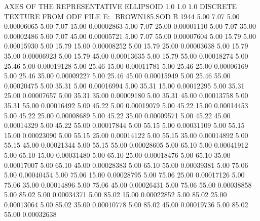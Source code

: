 AXES OF THE REPRESENTATIVE ELLIPSOID
   1.0   1.0   1.0
DISCRETE TEXTURE FROM ODF FILE  E:\TEXTURES\ZR_BROWN\7185.SOD      
B    1944
      5.00      7.07      5.00     0.00006065
      5.00      7.07     15.00     0.00002863
      5.00      7.07     25.00     0.00001110
      5.00      7.07     35.00     0.00002486
      5.00      7.07     45.00     0.00005721
      5.00      7.07     55.00     0.00007604
      5.00     15.79      5.00     0.00015930
      5.00     15.79     15.00     0.00008252
      5.00     15.79     25.00     0.00003638
      5.00     15.79     35.00     0.00006923
      5.00     15.79     45.00     0.00013635
      5.00     15.79     55.00     0.00018274
      5.00     25.46      5.00     0.00019128
      5.00     25.46     15.00     0.00011781
      5.00     25.46     25.00     0.00006169
      5.00     25.46     35.00     0.00009227
      5.00     25.46     45.00     0.00015949
      5.00     25.46     55.00     0.00020475
      5.00     35.31      5.00     0.00016994
      5.00     35.31     15.00     0.00012295
      5.00     35.31     25.00     0.00007657
      5.00     35.31     35.00     0.00009180
      5.00     35.31     45.00     0.00013758
      5.00     35.31     55.00     0.00016492
      5.00     45.22      5.00     0.00019079
      5.00     45.22     15.00     0.00014453
      5.00     45.22     25.00     0.00008689
      5.00     45.22     35.00     0.00009571
      5.00     45.22     45.00     0.00014329
      5.00     45.22     55.00     0.00017844
      5.00     55.15      5.00     0.00031109
      5.00     55.15     15.00     0.00023090
      5.00     55.15     25.00     0.00014122
      5.00     55.15     35.00     0.00014892
      5.00     55.15     45.00     0.00021344
      5.00     55.15     55.00     0.00028605
      5.00     65.10      5.00     0.00041912
      5.00     65.10     15.00     0.00031480
      5.00     65.10     25.00     0.00018476
      5.00     65.10     35.00     0.00017007
      5.00     65.10     45.00     0.00028383
      5.00     65.10     55.00     0.00039381
      5.00     75.06      5.00     0.00040454
      5.00     75.06     15.00     0.00028795
      5.00     75.06     25.00     0.00017126
      5.00     75.06     35.00     0.00014896
      5.00     75.06     45.00     0.00026431
      5.00     75.06     55.00     0.00038858
      5.00     85.02      5.00     0.00034371
      5.00     85.02     15.00     0.00022852
      5.00     85.02     25.00     0.00013064
      5.00     85.02     35.00     0.00010778
      5.00     85.02     45.00     0.00019736
      5.00     85.02     55.00     0.00032638
